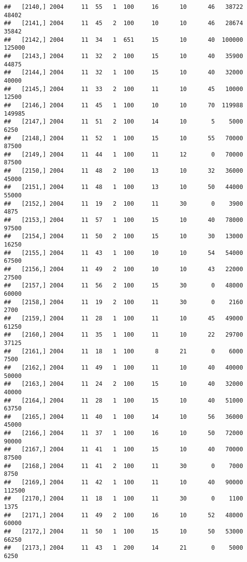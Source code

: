 \documentclass{article}\usepackage[]{graphicx}\usepackage[]{color}
\makeatletter
\newenvironment{kframe}{%
 \def\at@end@of@kframe{}%
 \ifinner\ifhmode%
  \def\at@end@of@kframe{\end{minipage}}%
  \begin{minipage}{\columnwidth}%
 \fi\fi%
 \def\FrameCommand##1{\hskip\@totalleftmargin \hskip-\fboxsep
 \colorbox{shadecolor}{##1}\hskip-\fboxsep
     \hskip-\linewidth \hskip-\@totalleftmargin \hskip\columnwidth}%
 \MakeFramed {\advance\hsize-\width
   \@totalleftmargin\z@ \linewidth\hsize
   \@setminipage}}%
 {\par\unskip\endMakeFramed%
 \at@end@of@kframe}
\newenvironment{knitrout}{}{} %
\makeatother
\begin{document}
\begin{knitrout}
\begin{kframe}
\begin{verbatim}
##   [2140,] 2004     11  55   1  100     16      10      46   38722   48402
##   [2141,] 2004     11  45   2  100     10      10      46   28674   35842
##   [2142,] 2004     11  34   1  651     15      10      40  100000  125000
##   [2143,] 2004     11  32   2  100     15      10      40   35900   44875
##   [2144,] 2004     11  32   1  100     15      10      40   32000   40000
##   [2145,] 2004     11  33   2  100     11      10      45   10000   12500
##   [2146,] 2004     11  45   1  100     10      10      70  119988  149985
##   [2147,] 2004     11  51   2  100     14      10       5    5000    6250
##   [2148,] 2004     11  52   1  100     15      10      55   70000   87500
##   [2149,] 2004     11  44   1  100     11      12       0   70000   87500
##   [2150,] 2004     11  48   2  100     13      10      32   36000   45000
##   [2151,] 2004     11  48   1  100     13      10      50   44000   55000
##   [2152,] 2004     11  19   2  100     11      30       0    3900    4875
##   [2153,] 2004     11  57   1  100     15      10      40   78000   97500
##   [2154,] 2004     11  50   2  100     15      10      30   13000   16250
##   [2155,] 2004     11  43   1  100     10      10      54   54000   67500
##   [2156,] 2004     11  49   2  100     10      10      43   22000   27500
##   [2157,] 2004     11  56   2  100     15      30       0   48000   60000
##   [2158,] 2004     11  19   2  100     11      30       0    2160    2700
##   [2159,] 2004     11  28   1  100     11      10      45   49000   61250
##   [2160,] 2004     11  35   1  100     11      10      22   29700   37125
##   [2161,] 2004     11  18   1  100      8      21       0    6000    7500
##   [2162,] 2004     11  49   1  100     11      10      40   40000   50000
##   [2163,] 2004     11  24   2  100     15      10      40   32000   40000
##   [2164,] 2004     11  28   1  100     15      10      40   51000   63750
##   [2165,] 2004     11  40   1  100     14      10      56   36000   45000
##   [2166,] 2004     11  37   1  100     16      10      50   72000   90000
##   [2167,] 2004     11  41   1  100     15      10      40   70000   87500
##   [2168,] 2004     11  41   2  100     11      30       0    7000    8750
##   [2169,] 2004     11  42   1  100     11      10      40   90000  112500
##   [2170,] 2004     11  18   1  100     11      30       0    1100    1375
##   [2171,] 2004     11  49   2  100     16      10      52   48000   60000
##   [2172,] 2004     11  50   1  100     15      10      50   53000   66250
##   [2173,] 2004     11  43   1  200     14      21       0    5000    6250

\end{verbatim}
\end{kframe}
\end{knitrout}
\end{document}
